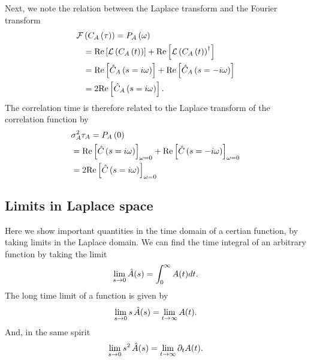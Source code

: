 Next, we note the relation between the Laplace transform and the Fourier transform
\begin{align}
\elabel{si:FT_of_corr}
{\cal F}&\br{C_A\br{\tau}}=P_A\br{\omega}\\
&={\rm Re}\sqbr{{\cal L}\br{C_A\br{t}}}+{\rm Re}\sqbr{{\cal L}\br{C_A\br{t}}^{\dagger}}\\
&={\rm Re}\sqbr{\hat{C}_A\br{s=i\omega}}+{\rm Re}\sqbr{\hat{C}_A\br{s=-i\omega}}\\
&=2{\rm Re}\sqbr{\hat{C}_A\br{s=i\omega}}.
\end{align}
The correlation time is therefore related to the Laplace transform of the correlation function by
\begin{align}
\elabel{si:laplace_corr_func_corr_time}
&\sigma_A^2\tau_A=P_A\br{0}\\
&={\rm Re}\sqbr{\hat{C}\br{s=i\omega}}_{\omega=0}+{\rm Re}\sqbr{\hat{C}\br{s=-i\omega}}_{\omega=0}\\
&=2{\rm Re}\sqbr{\hat{C}\br{s=i\omega}}_{\omega=0}
\end{align}


\subsection{ Limits in Laplace space}
Here we show important quantities in the time domain of a certian function, by taking limits in the Laplace domain. We can find the time integral of an arbitrary function by taking the limit
\begin{align}
\lim_{s \to 0} \hat{A}(s) = \int_0^\infty A(t) dt.
\elabel{si:int_vs_lap}
\end{align}
The long time limit of a function is given by
\begin{align}
\lim_{s \to 0} s \, \hat{A}(s) = \lim_{t \to \infty} A(t).
\elabel{si:longt_in_lap}
\end{align}
And, in the same spirit
\begin{align}
\lim_{s \to 0} s^2 \, \hat{A}(s) = \lim_{t \to \infty} \partial_t A(t).
\elabel{si:longt_in_lap2}
\end{align}


